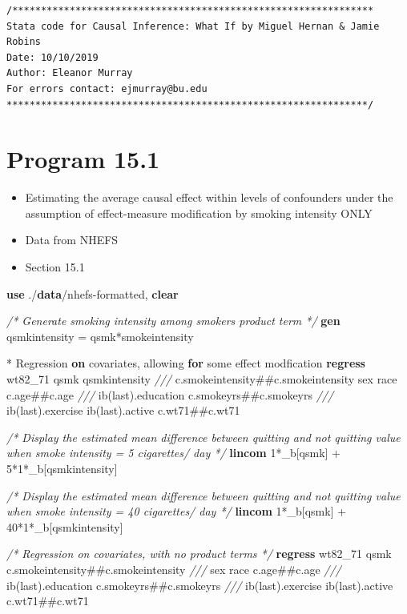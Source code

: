 \documentclass[
  10pt,
]{book}
\newenvironment{Shaded}{\begin{snugshade}}{\end{snugshade}}
\newcommand{\CommentTok}[1]{\textcolor[rgb]{0.56,0.35,0.01}{\textit{#1}}}
\newcommand{\FunctionTok}[1]{\textcolor[rgb]{0.00,0.00,0.00}{#1}}
\newcommand{\KeywordTok}[1]{\textcolor[rgb]{0.13,0.29,0.53}{\textbf{#1}}}
\newcommand{\NormalTok}[1]{#1}
\providecommand{\tightlist}{%
  \setlength{\itemsep}{0pt}\setlength{\parskip}{0pt}}
\begin{document}
\begin{verbatim}
/***************************************************************
Stata code for Causal Inference: What If by Miguel Hernan & Jamie Robins
Date: 10/10/2019
Author: Eleanor Murray 
For errors contact: ejmurray@bu.edu
***************************************************************/
\end{verbatim}

\hypertarget{program-15.1-1}{%
\section{Program 15.1}\label{program-15.1-1}}

\begin{itemize}
\tightlist
\item
  Estimating the average causal effect within levels of confounders under the assumption of effect-measure modification by smoking intensity ONLY
\item
  Data from NHEFS
\item
  Section 15.1
\end{itemize}

\begin{Shaded}
\begin{Highlighting}[]
\KeywordTok{use}\NormalTok{ ./}\KeywordTok{data}\NormalTok{/nhefs{-}formatted, }\KeywordTok{clear}

\CommentTok{/* Generate smoking intensity among smokers product term */}
\KeywordTok{gen}\NormalTok{ qsmkintensity = qsmk*smokeintensity}

\NormalTok{* Regression }\KeywordTok{on}\NormalTok{ covariates, allowing }\KeywordTok{for}\NormalTok{ some effect modfication}
\KeywordTok{regress}\NormalTok{ wt82\_71 qsmk qsmkintensity }\CommentTok{///}
\NormalTok{  c.smokeintensity\#\#c.smokeintensity sex race c.age\#\#c.age }\CommentTok{///}
\NormalTok{  ib(}\FunctionTok{last}\NormalTok{).education c.smokeyrs\#\#c.smokeyrs }\CommentTok{///}
\NormalTok{  ib(}\FunctionTok{last}\NormalTok{).exercise ib(}\FunctionTok{last}\NormalTok{).active c.wt71\#\#c.wt71 }

\CommentTok{/* Display the estimated mean difference between quitting and }
\CommentTok{  not quitting value when smoke intensity = 5 cigarettes/ day */}
\KeywordTok{lincom}\NormalTok{ 1*\_b[qsmk] + 5*1*\_b[qsmkintensity] }

\CommentTok{/* Display the estimated mean difference between quitting and }
\CommentTok{  not quitting value when smoke intensity = 40 cigarettes/ day */}
\KeywordTok{lincom}\NormalTok{ 1*\_b[qsmk] + 40*1*\_b[qsmkintensity]}

\CommentTok{/* Regression on covariates, with no product terms */}
\KeywordTok{regress}\NormalTok{ wt82\_71 qsmk c.smokeintensity\#\#c.smokeintensity }\CommentTok{///}
\NormalTok{  sex race c.age\#\#c.age }\CommentTok{///}
\NormalTok{  ib(}\FunctionTok{last}\NormalTok{).education c.smokeyrs\#\#c.smokeyrs }\CommentTok{///}
\NormalTok{  ib(}\FunctionTok{last}\NormalTok{).exercise ib(}\FunctionTok{last}\NormalTok{).active c.wt71\#\#c.wt71 }
\end{Highlighting}
\end{Shaded}
\end{document}
